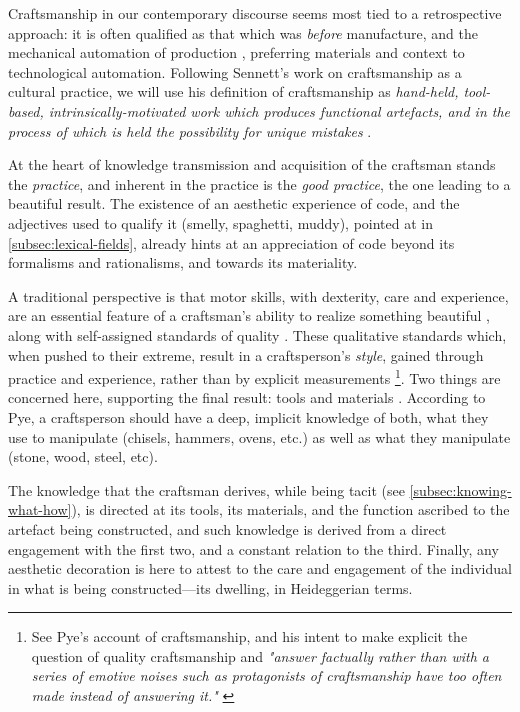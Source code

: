 Craftsmanship in our contemporary discourse seems most tied to a retrospective approach: it is often qualified as that which was \emph{before} manufacture, and the mechanical automation of production \citep{thompson_study_1934}, preferring materials and context to technological automation. Following Sennett's work on craftsmanship as a cultural practice, we will use his definition of craftsmanship as \emph{hand-held, tool-based, intrinsically-motivated work which produces functional artefacts, and in the process of which is held the possibility for unique mistakes} \citep{sennett_craftsman_2009}.

At the heart of knowledge transmission and acquisition of the craftsman stands the \emph{practice}, and inherent in the practice is the \emph{good practice}, the one leading to a beautiful result. The existence of an aesthetic experience of code, and the adjectives used to qualify it (smelly, spaghetti, muddy), pointed at in \ref{subsec:lexical-fields}, already hints at an appreciation of code beyond its formalisms and rationalisms, and towards its materiality.

A traditional perspective is that motor skills, with dexterity, care and experience, are an essential feature of a craftsman's ability to realize something beautiful \citep{osborne_aesthetic_1977}, along with self-assigned standards of quality \citep{pye_nature_2008,sennett_craftsman_2009}. These qualitative standards which, when pushed to their extreme, result in a craftsperson's \emph{style}, gained through practice and experience, rather than by explicit measurements \citep{pye_nature_2008} \footnote{See Pye's account of craftsmanship, and his intent to make explicit the question of quality craftsmanship and \emph{"answer factually rather than with a series of emotive noises such as protagonists of craftsmanship have too often made instead of answering it."} \citep{pye_nature_2008}}. Two things are concerned here, supporting the final result: tools and materials \citep{pye_nature_2008}. According to Pye, a craftsperson should have a deep, implicit knowledge of both, what they use to manipulate (chisels, hammers, ovens, etc.) as well as what they manipulate (stone, wood, steel, etc).

The knowledge that the craftsman derives, while being tacit (see \ref{subsec:knowing-what-how}), is directed at its tools, its materials, and the function ascribed to the artefact being constructed, and such knowledge is derived from a direct engagement with the first two, and a constant relation to the third. Finally, any aesthetic decoration is here to attest to the care and engagement of the individual in what is being constructed—its dwelling, in Heideggerian terms.

